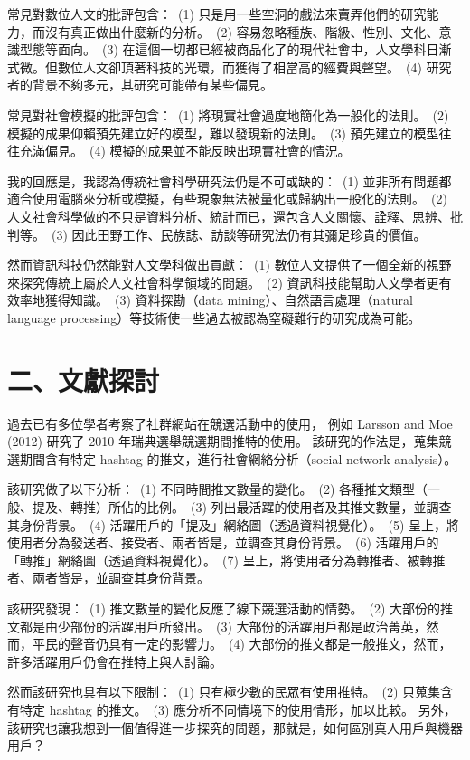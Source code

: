 \documentclass[letterpaper, 10pt, conference]{ieeeconf}   %
\begin{document}
\begin{CJK}{UTF8}{bsmi}
常見對數位人文的批評包含：%
\,(1) 只是用一些空洞的戲法來賣弄他們的研究能力，而沒有真正做出什麼新的分析。%
\,(2) 容易忽略種族、階級、性別、文化、意識型態等面向。%
\,(3) 在這個一切都已經被商品化了的現代社會中，人文學科日漸式微。但數位人文卻頂著科技的光環，而獲得了相當高的經費與聲望。%
\,(4) 研究者的背景不夠多元，其研究可能帶有某些偏見。%

常見對社會模擬的批評包含：%
\,(1) 將現實社會過度地簡化為一般化的法則。%
\,(2) 模擬的成果仰賴預先建立好的模型，難以發現新的法則。%
\,(3) 預先建立的模型往往充滿偏見。%
\,(4) 模擬的成果並不能反映出現實社會的情況。%

我的回應是，我認為傳統社會科學研究法仍是不可或缺的：%
\,(1) 並非所有問題都適合使用電腦來分析或模擬，有些現象無法被量化或歸納出一般化的法則。%
\,(2) 人文社會科學做的不只是資料分析、統計而已，還包含人文關懷、詮釋、思辨、批判等。%
\,(3) 因此田野工作、民族誌、訪談等研究法仍有其彌足珍貴的價值。%

然而資訊科技仍然能對人文學科做出貢獻：%
\,(1) 數位人文提供了一個全新的視野來探究傳統上屬於人文社會科學領域的問題。%
\,(2) 資訊科技能幫助人文學者更有效率地獲得知識。%
\,(3) 資料探勘（data mining）、自然語言處理（natural language processing）等技術使一些過去被認為窒礙難行的研究成為可能。%

\section*{二、文獻探討}

過去已有多位學者考察了社群網站在競選活動中的使用，%
例如 Larsson and Moe (2012) 研究了 2010 年瑞典選舉競選期間推特的使用。\cite{c1} %
該研究的作法是，蒐集競選期間含有特定 hashtag 的推文，進行社會網絡分析（social network analysis）。%

該研究做了以下分析：%
\,(1) 不同時間推文數量的變化。%
\,(2) 各種推文類型（一般、提及、轉推）所佔的比例。%
\,(3) 列出最活躍的使用者及其推文數量，並調查其身份背景。%
\,(4) 活躍用戶的「提及」網絡圖（透過資料視覺化）。%
\,(5) 呈上，將使用者分為發送者、接受者、兩者皆是，並調查其身份背景。%
\,(6) 活躍用戶的「轉推」網絡圖（透過資料視覺化）。%
\,(7) 呈上，將使用者分為轉推者、被轉推者、兩者皆是，並調查其身份背景。%

該研究發現：%
\,(1) 推文數量的變化反應了線下競選活動的情勢。%
\,(2) 大部份的推文都是由少部份的活躍用戶所發出。%
\,(3) 大部份的活躍用戶都是政治菁英，然而，平民的聲音仍具有一定的影響力。%
\,(4) 大部份的推文都是一般推文，然而，許多活躍用戶仍會在推特上與人討論。%

然而該研究也具有以下限制：%
\,(1) 只有極少數的民眾有使用推特。%
\,(2) 只蒐集含有特定 hashtag 的推文。%
\,(3) 應分析不同情境下的使用情形，加以比較。%
另外，該研究也讓我想到一個值得進一步探究的問題，那就是，如何區別真人用戶與機器用戶？%


\end{CJK}
\end{document}
